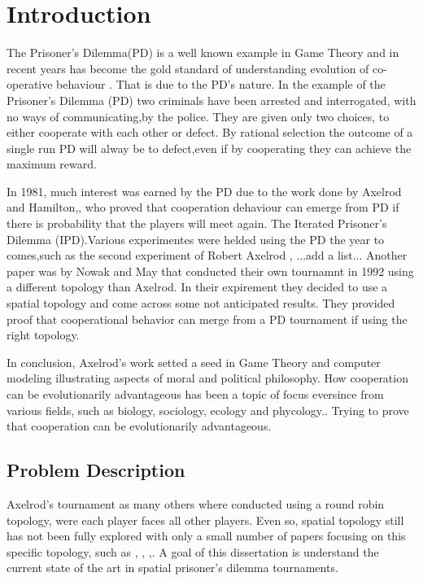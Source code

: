 \chapter{Introduction}

The Prisoner's Dilemma(PD) is a well known example in Game Theory and in recent
years has become the gold standard of understanding evolution of
co-operative behaviour \parencite{Lorberbaum1994}. That is due to the PD's nature.
In the example of the Prisoner's Dilemma (PD) two criminals have been arrested and
interrogated, with no ways of communicating,by the police.
They are given only two choices, to either cooperate with each other or defect.
By rational selection the outcome of a single run PD will alway be to defect,even
if by cooperating they can achieve the maximum reward.

In 1981, much interest was earned by the PD due to the work done by Axelrod and
Hamilton,\parencite{Axelrod_&_Hamilton1981}, who proved that cooperation dehaviour
can emerge from PD if there is probability that the players will meet again. The
Iterated Prisoner's Dilemma (IPD).Various experimentes were helded using the PD the
year to comes,such as the second experiment of Robert Axelrod \parencite{Axelrod1980b},
...add a list...
Another paper was by Nowak and May \parencite{Nowak_&_May1992} that conducted
their own tournamnt in 1992 using a different topology than Axelrod. In their
expirement they decided to use a spatial topology and come across some not
anticipated results. They provided proof that cooperational behavior can merge
from a PD tournament if using the right topology.

In conclusion, Axelrod's work setted a seed in Game Theory and computer modeling
illustrating aspects of moral and political philosophy. How cooperation can be
evolutionarily advantageous has been a topic of focus eversince from various fields,
such as biology, sociology, ecology and phycology.\parencite{Nowak_&_May1992}.
Trying to prove that cooperation can be evolutionarily advantageous.

\section{Problem Description}
Axelrod's tournament as many others where conducted using a round robin topology,
were each player faces all other players. Even so, spatial topology still has
not been fully explored with only a small number of papers focusing on this
specific topology, such as \parencite{Nowak_&_May1993}, \parencite{Brauchli_&_Killingback_&_Doebelis1999},
\parencite{Meng&Xia_etc2015},\parencite{Lindgren_&_Nordahl1994}. A goal of this
dissertation is understand the current state of the art in spatial prisoner’s dilemma
tournaments.

